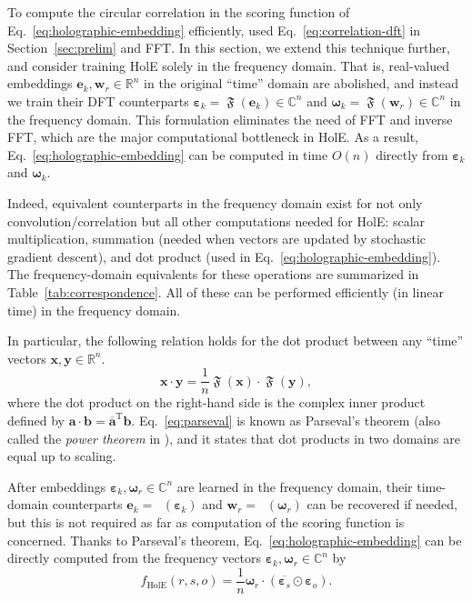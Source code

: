 \documentclass[11pt,a4paper]{article}
\def\mat#1{\boldsymbol{\mathbf{#1}}}
\def\transpose{^{\mathrm{T}}}
\def\Cset{\mathbb{C}}
\def\Rset{\mathbb{R}}
\let\hprod\odot
\def\DFT{\mathop{\mathfrak{F}}}
\def\IDFT{\mathop{\mathfrak{F}^{-1}}}
\begin{document}
To compute the circular correlation in the scoring function of Eq.~\eqref{eq:holographic-embedding} efficiently,
\citet{Nickel:16} used Eq.~\eqref{eq:correlation-dft} in Section~\ref{sec:prelim} and FFT.
In this section,
we extend this technique further, and consider training HolE solely in the frequency domain.
That is, real-valued embeddings $\mat{e}_k, \mat{w}_r \in \Rset^n$ in the original ``time'' domain are abolished,
and instead we train their DFT counterparts
$\mat{\varepsilon}_k=\DFT(\mat{e}_k) \in \Cset^n$ and $\mat{\omega}_k=\DFT(\mat{w}_r) \in \Cset^n$
in the frequency domain.
This formulation eliminates the need of FFT and inverse FFT,
which are the major computational bottleneck in HolE.
As a result,
Eq.~\eqref{eq:holographic-embedding} can be computed in time $O(n)$
directly from $\mat{\varepsilon}_k$ and $\mat{\omega}_k$.

Indeed,
equivalent counterparts in the frequency domain
exist for not only convolution\slash correlation but all other computations
needed for HolE:
scalar multiplication, summation
(needed when vectors are updated by stochastic gradient descent),
and
dot product (used in Eq.~\eqref{eq:holographic-embedding}).
The frequency-domain equivalents for these operations are 
summarized in Table~\ref{tab:correspondence}.
All of these can be performed efficiently (in linear time) in the frequency domain.

In particular, the following relation holds for the dot product between any ``time'' vectors $\mat{x}, \mat{y}\in \Rset^n$.
\begin{equation}
  \mat{x}\cdot \mat{y} = \frac{1}{n} \DFT(\mat{x}) \cdot \DFT(\mat{y}),
  \label{eq:parseval}
\end{equation}
where the dot product on the right-hand side is the complex inner product defined by $\mat{a}\cdot \mat{b} = \overline{\mat{a}}\transpose \mat{b}$.
Eq.~\eqref{eq:parseval} is known as
Parseval's theorem (also called the \emph{power theorem} in \citep{Smith:07}),
and it states that dot products in two domains
are equal up to scaling. 

After embeddings $\mat{\varepsilon}_k, \mat{\omega}_r \in \Cset^n$
are learned in the frequency domain,
their time-domain counterparts $\mat{e}_k = \IDFT(\mat{\varepsilon}_k)$ and $\mat{w}_r = \IDFT(\mat{\omega}_r)$ can be recovered if needed,
but this is not required as far as computation of the scoring function is concerned.
Thanks to Parseval's theorem, Eq.~\eqref{eq:holographic-embedding}
can be directly computed from the frequency vectors $\mat{\varepsilon}_k, \mat{\omega}_r \in \Cset^n$
by
\begin{equation}
  \label{eq:holographic-embedding-freq}
  f_{\text{HolE}}(r,s,o) = \frac{1}{n} \mat{\omega}_r \cdot ( \overline{ \mat{\varepsilon}_s } \hprod \mat{\varepsilon}_o).
\end{equation}
\end{document}
